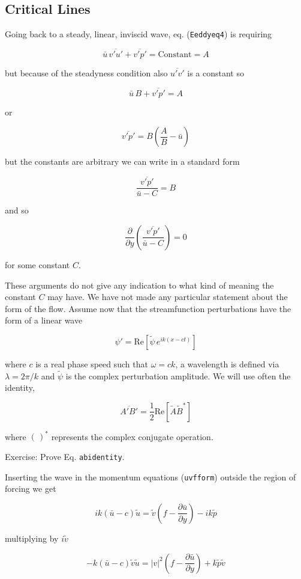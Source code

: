 \subsection{Critical Lines}\label{critical-lines}

Going back to a steady, linear, inviscid wave, eq. (\texttt{Eeddyeq4})
is requiring

\[\bar{u}\, \overline{v'u'}+ \overline{v'p'} = \text{Constant} = A\]

but because of the steadyness condition also \(\overline{u'v'}\) is a
constant so

\[\bar{u}\, B + \overline{v'p'} = A\]

or

\[\overline{v'p'} = B\left(\frac{A}{B}-\bar{u}\right)\]

but the constants are arbitrary we can write in a standard form

\[\frac{\overline{v'p'}}{\bar{u}- C} = B\]

and so

\[\frac{\partial }{\partial y}\left(\frac{\overline{v'p'}}{\bar{u}- C}\right) =0\]

for some constant \(C\).

These arguments do not give any indication to what kind of meaning the
constant \(C\) may have. We have not made any particular statement about
the form of the flow. Assume now that the streamfunction perturbations
have the form of a linear wave

{\[\psi ' = \mathrm{Re}\left[ \tilde{\psi}\,e^{i k ( x - c t)}\right]\]}

where \(c\) is a real phase speed such that \(\omega = c k\), a
wavelength is defined via \(\lambda = 2\pi/k\) and \(\tilde{\psi}\) is
the complex perturbation amplitude. We will use often the identity,

{\[\overline{A'B'}=\frac{1}{2}\mathrm{Re}\left[ \tilde{A}\tilde{B}^*\right]\]}

where \((\,)^*\) represents the complex conjugate operation.

Exercise: Prove Eq. \texttt{abidentity}.

Inserting the wave in the momentum equations (\texttt{uvfform}) outside
the region of forcing we get

\[i k (\bar{u}-c ) \tilde{u} = \tilde{v}\left( f -\frac{\partial \bar{u}}{\partial y}\right) - i k \tilde{p}\]

multiplying by \(i \tilde{v}\)

\[- k (\bar{u}-c ) \tilde{v} \tilde{u}= |v|^2 \left( f -\frac{\partial \bar{u}}{\partial y}\right) + k \tilde{p}\tilde{v}\]

